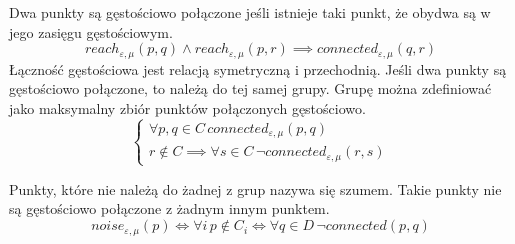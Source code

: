 Dwa punkty są gęstościowo połączone jeśli istnieje taki punkt, że obydwa są w jego zasięgu gęstościowym.
\begin{equation}
	reach_{\varepsilon,\mu}(p, q) \land reach_{\varepsilon,\mu}(p, r) \implies connected_{\varepsilon,\mu}(q, r)
\end{equation}
Łączność gęstościowa jest relacją symetryczną i przechodnią. Jeśli dwa punkty są gęstościowo połączone, to należą do tej samej grupy. Grupę można zdefiniować jako maksymalny zbiór punktów połączonych gęstościowo.
\begin{equation}
	\begin{cases} 
		\forall p, q \in C\,connected_{\varepsilon,\mu}(p,q) \\
		r \notin C \implies \forall s \in C \,\neg connected_{\varepsilon,\mu}(r, s)
	\end{cases}
\end{equation}


Punkty, które nie należą do żadnej z grup nazywa się szumem. Takie punkty nie są gęstościowo połączone z żadnym innym punktem.
\begin{equation}
	noise_{\varepsilon,\mu}(p) \iff \forall i \,p\notin C_i \iff \forall q \in D \,\neg connected(p,q)
\end{equation}

